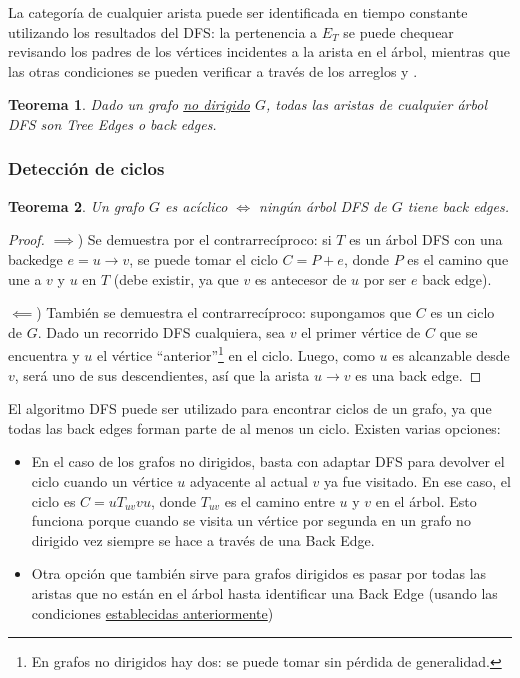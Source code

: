 \documentclass[a4paper]{report}
\newtheorem*{theorem*}{Teorema}
\begin{document}
La categoría de cualquier arista puede ser identificada en tiempo constante utilizando los resultados del DFS: la pertenencia a $E_T$ se puede chequear revisando los padres de los vértices incidentes a la arista en el árbol, mientras que las otras condiciones se pueden verificar a través de los arreglos  y .
\begin{theorem*}
    Dado un grafo \underline{no dirigido} $G$, todas las aristas de cualquier árbol DFS son Tree Edges o back edges.
\end{theorem*}

\subsubsection{Detección de ciclos}

\begin{theorem*}
    Un grafo $G$ es acíclico $\iff$ ningún árbol DFS de $G$ tiene back edges.
\end{theorem*}
\begin{proof}
    \leavevmode

    $\implies$) Se demuestra por el contrarrecíproco: si $T$ es un árbol DFS con una backedge $e = u \rightarrow v$, se puede tomar el ciclo $C = P + e$, donde $P$ es el camino que une a $v$ y $u$ en $T$ (debe existir, ya que $v$ es antecesor de $u$ por ser $e$ back edge).

    $\impliedby$) También se demuestra el contrarrecíproco: supongamos que $C$ es un ciclo de $G$. Dado un recorrido DFS cualquiera, sea $v$ el primer vértice de $C$ que se encuentra y $u$ el vértice ``anterior''\footnote{En grafos no dirigidos hay dos: se puede tomar sin pérdida de generalidad.} en el ciclo. Luego, como $u$ es alcanzable desde $v$, será uno de sus descendientes, así que la arista $u \rightarrow v$ es una back edge.

\end{proof}

El algoritmo DFS puede ser utilizado para encontrar ciclos de un grafo, ya que todas las back edges forman parte de al menos un ciclo. Existen varias opciones:
\begin{itemize}
    \item En el caso de los grafos no dirigidos, basta con adaptar DFS para devolver el ciclo cuando un vértice $u$ adyacente al actual $v$ ya fue visitado. En ese caso, el ciclo es $C = uT_{uv}vu$, donde $T_{uv}$ es el camino entre $u$ y $v$ en el árbol. Esto funciona porque cuando se visita un vértice por segunda en un grafo no dirigido vez siempre se hace a través de una Back Edge.
    \item Otra opción que también sirve para grafos dirigidos es pasar por todas las aristas que no están en el árbol hasta identificar una Back Edge (usando las condiciones \hyperref[dfs-edges]{establecidas anteriormente})
\end{itemize}
\end{document}
